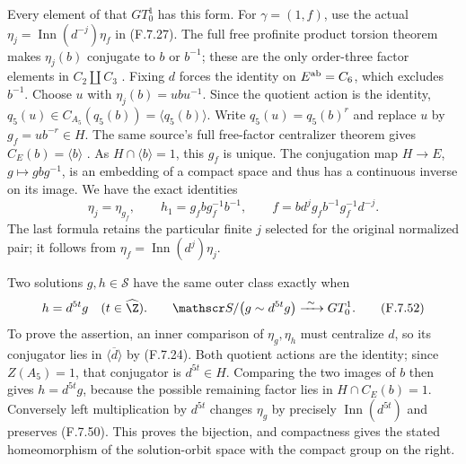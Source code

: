 Every element of that $GT_0^1$ has this form.
For $\gamma=(1,f)$, use the actual
$\eta_j=\operatorname{Inn}(d^{-j})\eta_f$ in
(F.7.27).  The full free profinite product torsion
theorem makes $\eta_j(b)$ conjugate to $b$ or
$b^{-1}$; these are the only order-three factor
elements in $C_2\amalg C_3$
\cite[Theorem A and Section 3]{A-HerfortRibes1985}.
Fixing $d$ forces the identity on
$E^{\rm ab}=C_6$, which excludes $b^{-1}$.
Choose $u$ with $\eta_j(b)=ubu^{-1}$.
Since the quotient action is the identity,
$q_5(u)\in C_{A_5}(q_5(b))=\langle q_5(b)\rangle$.
Write $q_5(u)=q_5(b)^r$ and replace $u$ by
$g_f=ub^{-r}\in H$.  The same source's full
free-factor centralizer theorem gives
$C_E(b)=\langle b\rangle$
\cite[Theorem B and Section 4]{A-HerfortRibes1985}.
As $H\cap\langle b\rangle=1$, this $g_f$ is unique.
The conjugation map $H\to E$, $g\mapsto gbg^{-1}$,
is an embedding of a compact space and thus has
a continuous inverse on its image.
We have the exact identities
\[
 \eta_j=\eta_{g_f},\qquad
 h_1=g_f b g_f^{-1}b^{-1},\qquad
 f=b d^j g_f b^{-1}g_f^{-1}d^{-j}.
                                                               \tag{F.7.51}
\]
The last formula retains the particular finite
$j$ selected for the original normalized pair;
it follows from $\eta_f=\operatorname{Inn}(d^j)\eta_j$.

Two solutions $g,h\in\mathscr S$ have the same
outer class exactly when
\[
                   h=d^{5t}g\quad(t\in\widehat\Z).
 \qquad
 \mathscr S/\bigl(g\sim d^{5t}g\bigr)
                         \xrightarrow{\ \sim\ }GT_0^1.
                                                               \tag{F.7.52}
\]
To prove the assertion, an inner comparison of
$\eta_g,\eta_h$ must centralize $d$, so its
conjugator lies in $\overline{\langle d\rangle}$
by (F.7.24).  Both quotient actions are the
identity; since $Z(A_5)=1$, that conjugator is
$d^{5t}\in H$.  Comparing the two images of $b$
then gives $h=d^{5t}g$, because the possible
remaining factor lies in
$H\cap C_E(b)=1$.  Conversely left multiplication
by $d^{5t}$ changes $\eta_g$ by precisely
$\operatorname{Inn}(d^{5t})$ and preserves
(F.7.50).
This proves the bijection, and compactness gives
the stated homeomorphism of the solution-orbit
space with the compact group on the right.

